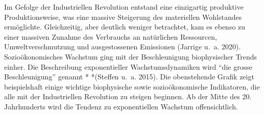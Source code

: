 \documentclass[
  nswissgerman,
  a4paper,
  DIV=11,
  numbers=noendperiod,
  oneside,
  openany]{scrreprt}
\begin{document}
Im Gefolge der Industriellen Revolution entstand eine einzigartig
produktive Produktionsweise, was eine massive Steigerung des materiellen
Wohlstandes ermöglichte. Gleichzeitig, aber deutlich weniger betrachtet,
kam es ebenso zu einer massiven Zunahme des Verbrauchs an natürlichen
Ressourcen, Umweltverschmutzung und ausgestossenen Emissionen (Jarrige
u.~a. 2020). Sozioökonomisches Wachstum ging mit der Beschleunigung
biophysischer Trends einher. Die Beschreibung exponentieller
Wachstumsdynamiken wird ``die grosse Beschleunigung'' genannt *
*(Steffen u.~a. 2015). Die obenstehende Grafik zeigt beispielshaft
einige wichtige biophysische sowie sozioökonomische Indikatoren, die
alle mit der Industriellen Revolution zu steigen beginnen. Ab der Mitte
des 20. Jahrhunderts wird die Tendenz zu exponentiellen Wachstum
offensichtlich.
\end{document}
